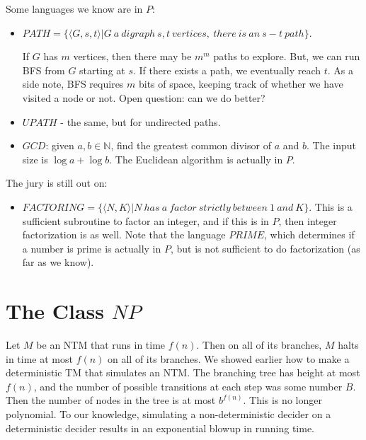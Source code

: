 Some languages we know are in $P$:
\begin{itemize}
	\item $PATH = \{\langle G,s,t\rangle | G \ a \ digraph \ s,t\ vertices, \ there \ is \ an \ s- t\ path\}$.  
	
	If $G$ has $m$ vertices, then there may be $m^m$ paths to explore.  But, we can run BFS from $G$ starting at $s$.  If there exists a path, we eventually reach $t$.  As a side note, BFS requires $m$ bits of space, keeping track of whether we have visited a node or not.  Open question: can we do better?
	\item $UPATH$ - the same, but for undirected paths.
	\item $GCD$: given $a,b\in\mathbb{N}$, find the greatest common divisor of $a$ and $b$.  The input size is $\log{a} + \log{b}$.  The Euclidean algorithm is actually in $P$.  

\end{itemize}

The jury is still out on:
\begin{itemize}
	\item $FACTORING = \{\langle N,K \rangle | N \ has \ a \ factor \ strictly \ between \ 1  \ and \ K \}$.  This is a sufficient subroutine to factor an integer, and if this is in $P$, then integer factorization is as well.  Note that the language $PRIME$, which determines if a number is prime is actually in $P$, but is not sufficient to do factorization (as far as we know).
\end{itemize}

\section*{The Class $NP$}




Let $M$ be an NTM that runs in time $f(n)$.  Then on all of its branches, $M$ halts in time at most $f(n)$ on all of its branches.  We showed earlier how to make a deterministic TM that simulates an NTM.  The branching tree has height at most $f(n)$, and the number of possible transitions at each step was some number $B$.  Then the number of nodes in the tree is at most $b^{f(n)}$. This is no longer polynomial.  To our knowledge, simulating a non-deterministic decider on a deterministic decider results in an exponential blowup in running time.


